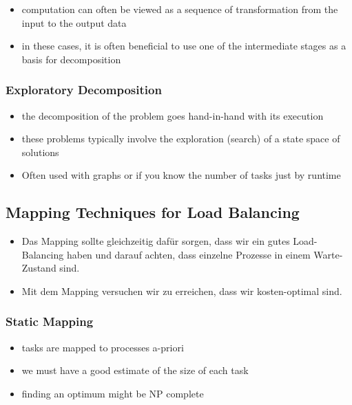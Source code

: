 \begin{itemize}
\tightlist
\item
  computation can often be viewed as a sequence of transformation from
  the input to the output data
\item
  in these cases, it is often beneficial to use one of the intermediate
  stages as a basis for decomposition
\end{itemize}

\hypertarget{exploratory-decomposition}{%
\subsubsection{Exploratory
Decomposition}\label{exploratory-decomposition}}

\begin{itemize}
\tightlist
\item
  the decomposition of the problem goes hand-in-hand with its execution
\item
  these problems typically involve the exploration (search) of a state
  space of solutions
\item
  Often used with graphs or if you know the number of tasks just by
  runtime
\end{itemize}

\hypertarget{mapping-techniques-for-load-balancing}{%
\subsection{Mapping Techniques for Load
Balancing}\label{mapping-techniques-for-load-balancing}}

\begin{itemize}
\tightlist
\item
  Das Mapping sollte gleichzeitig dafür sorgen, dass wir ein gutes
  Load-Balancing haben und darauf achten, dass einzelne Prozesse in
  einem Warte-Zustand sind.
\item
  Mit dem Mapping versuchen wir zu erreichen, dass wir kosten-optimal
  sind.
\end{itemize}

\hypertarget{static-mapping}{%
\subsubsection{Static Mapping}\label{static-mapping}}

\begin{itemize}
\tightlist
\item
  tasks are mapped to processes a-priori
\item
  we must have a good estimate of the size of each task
\item
  finding an optimum might be NP complete
\end{itemize}

